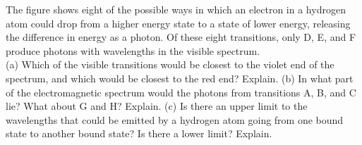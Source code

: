 The figure shows eight of the possible ways in which an
electron in a hydrogen atom could drop from a higher energy
state to a state of lower energy, releasing the difference
in energy as a photon. Of these eight transitions, only D,
E, and F produce photons with wavelengths in the visible
spectrum.\\
 (a) Which of the visible transitions would be
closest to the violet end of the spectrum, and which would
be closest to the red end? Explain.\hwendpart
 (b) In what part of the
electromagnetic spectrum would the photons from transitions
A, B, and C lie? What about G and H? Explain.\hwendpart
 (c) Is
there an upper limit to the wavelengths that could be
emitted by a hydrogen atom going from one bound state to
another bound state? Is there a lower limit? Explain.
